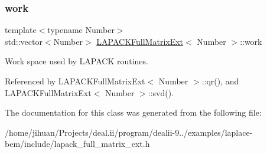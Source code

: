 \mbox{\label{classLAPACKFullMatrixExt_a971d29c6d7664fca553b6ba377519946}} 
\subsubsection{\texorpdfstring{work}{work}}
{\footnotesize\ttfamily template$<$typename Number$>$ \\
std\+::vector$<$Number$>$ \hyperlink{classLAPACKFullMatrixExt}{L\+A\+P\+A\+C\+K\+Full\+Matrix\+Ext}$<$ Number $>$\+::work\hspace{0.3cm}{\ttfamily [private]}}

Work space used by L\+A\+P\+A\+CK routines. 

Referenced by L\+A\+P\+A\+C\+K\+Full\+Matrix\+Ext$<$ Number $>$\+::qr(), and L\+A\+P\+A\+C\+K\+Full\+Matrix\+Ext$<$ Number $>$\+::svd().



The documentation for this class was generated from the following file\+:\begin{DoxyCompactItemize}
\item 
/home/jihuan/\+Projects/deal.\+ii/program/dealii-\/9../examples/laplace-\/bem/include/lapack\+\_\+full\+\_\+matrix\+\_\+ext.\+h\end{DoxyCompactItemize}
